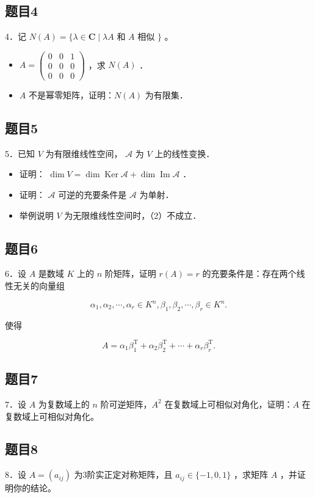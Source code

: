 \documentclass{article}
\begin{document}
\subsection{题目4}
4．记 \(N(A)=\{\lambda \in \mathbf{C} \mid \lambda A\) 和 \(A\) 相似 \(\}\) 。

\begin{itemize}
  \item[（1）] \(A=\left(\begin{array}{lll}0 & 0 & 1 \\ 0 & 0 & 0 \\ 0 & 0 & 0\end{array}\right)\) ，求 \(N(A)\) ．
  \item[（2）] \(A\) 不是幂零矩阵，证明：\(N(A)\) 为有限集．
\end{itemize}

\subsection{题目5}
5．已知 \(V\) 为有限维线性空间， \(\mathcal{A}\) 为 \(V\) 上的线性变换．

\begin{itemize}
  \item[（1）] 证明： \(\operatorname{dim} V=\operatorname{dim} \operatorname{Ker} \mathcal{A}+\operatorname{dim} \operatorname{Im} \mathcal{A}\) ．
  \item[（2）] 证明： \(\mathcal{A}\) 可逆的充要条件是 \(\mathcal{A}\) 为单射．
  \item[（3）] 举例说明 \(V\) 为无限维线性空间时，（2）不成立．
\end{itemize}

\subsection{题目6}
6．设 \(A\) 是数域 \(K\) 上的 \(n\) 阶矩阵，证明 \(r(A)=r\) 的充要条件是：存在两个线性无关的向量组

\[
\alpha_{1}, \alpha_{2}, \cdots, \alpha_{r} \in K^{n}, \beta_{1}, \beta_{2}, \cdots, \beta_{r} \in K^{n} .
\]

使得

\[
A=\alpha_{1} \beta_{1}^{\mathrm{T}}+\alpha_{2} \beta_{2}^{\mathrm{T}}+\cdots+\alpha_{r} \beta_{r}^{\mathrm{T}} .
\]

\subsection{题目7}
7．设 \(A\) 为复数域上的 \(n\) 阶可逆矩阵，\(A^{2}\) 在复数域上可相似对角化，证明：\(A\) 在复数域上可相似对角化。

\subsection{题目8}
8．设 \(A=\left(a_{i j}\right)\) 为3阶实正定对称矩阵，且 \(a_{i j} \in\{-1,0,1\}\) ，求矩阵 \(A\) ，并证明你的结论。
\end{document}
